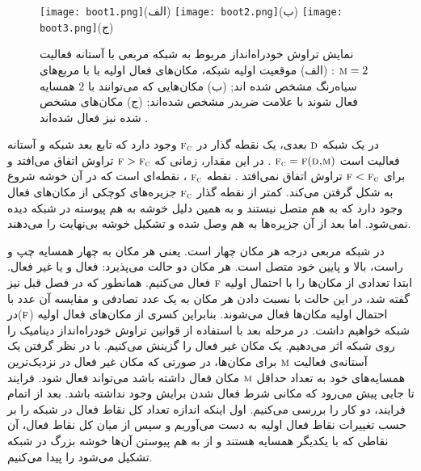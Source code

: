  \begin{figure}[htbp]
 \hspace*{0cm}
 \centering
 \texttt{[image: boot1.png]}\centering(الف)    
 \texttt{[image: boot2.png]}\centering(ب)
 \texttt{[image: boot3.png]}\centering(ج)
 \caption[نمایش تراوش خودراه‌انداز مربوط به شبکه مربعی] {\footnotesize نمایش تراوش خودراه‌انداز  مربوط به شبکه مربعی با آستانه فعالیت 
 $\textsc{m} = 2$
 : (الف) موقعیت اولیه شبکه، مکان‌های فعال اولیه با با مربع‌های سیاه‌رنگ مشخص شده اند; (ب) مکان‌هایی که می‌توانند با $2$ همسایه فعال شوند با علامت ضربدر مشخص شده‌اند; (ج) مکان‌های مشخص شده نیز فعال شده‌اند \cite{kozma}.}
 \label{fig:boot}
 \end{figure}
 
 در یک شبکه 
 $\textsc{d}$
  بعدی، یک نقطه گذار در  
  $\textsc{f}_{\textsc{c}}$
   وجود دارد که تابع بعد شبکه و آستانه فعالیت است 
   $\textsc{f}_{\textsc{c}} = \textsc{f}(\textsc{d,m})$
   . در این مقدار، زمانی که
     $\textsc{f} > \textsc{f}_\textsc{{c}}$
      تراوش اتفاق می‌افتد و برای 
      $\textsc{f} < \textsc{f}_{\textsc{c}}$
       تراوش اتفاق نمی‌افتد \cite{kozma}. نقطه 
       $\textsc{f}_{\textsc{c}}$
       ، نقطه‌ای است که در آن خوشه شروع به شکل گرفتن می‌کند. کمتر از نقطه گذار 
       $\textsc{f}_{\textsc{c}}$
        جزیره‌های کوچکی از مکان‌های فعال وجود دارد که به هم متصل نیستند و به همین دلیل خوشه به هم پیوسته در شبکه دیده نمی‌شود. اما بعد از آن جزیره‌ها به هم وصل شده و تشکیل خوشه بی‌نهایت را می‌دهند.
 
   در شبکه مربعی درجه هر مکان چهار است. یعنی هر مکان به چهار همسایه چپ و راست، بالا و پایین خود متصل است. هر مکان دو حالت می‌پذیرد: فعال و یا غیر فعال. ابتدا تعدادی از مکان‌ها را با احتمال اولیه 
   $\textsc{f}$ فعال می‌کنیم. همانطور که در فصل قبل نیز گفته شد، در این حالت با نسبت دادن هر مکان به یک عدد تصادفی و مقایسه آن عدد با احتمال اولیه مکان‌ها فعال می‌شوند. بنابراین کسری از مکان‌های فعال اولیه ($\textsc{f}$)در شبکه خواهیم داشت. در مرحله بعد با استفاده از قوانین تراوش خودراه‌انداز دینامیک را روی شبکه اثر می‌دهیم. یک مکان غیر فعال را گزینش می‌کنیم. با در نظر گرفتن یک آستانه‌ی فعالیت 
   $\textsc{m}$ 
   برای مکان‌ها، در صورتی که مکان غیر فعال در نزدیک‌ترین همسایه‌های خود به تعداد حداقل 
   $\textsc{m}$
    مکان فعال داشته باشد می‌تواند فعال شود. فرایند تا جایی پیش می‌رود که مکانی شرط فعال شدن برایش وجود نداشته باشد. بعد از اتمام فرایند، دو کار را بررسی می‌کنیم. اول اینکه اندازه  تعداد کل نقاط فعال در شبکه را  بر حسب تغییرات نقاط فعال اولیه  به دست می‌آوریم و سپس از میان کل نقاط فعال، آن نقاطی  که با یکدیگر همسایه هستند و از به هم پیوستن آن‌ها خوشه بزرگ در شبکه تشکیل می‌شود را پیدا می‌کنیم.  
 
